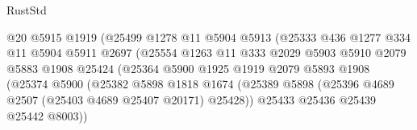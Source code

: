 \begin{lexlean}{RustStd}
\begin{coremodule}
{\begin{coremodule}
{{{{{{{{{{{{{{{{{{{{{{{{{{{{{{{{{{{{{{{{{{{                                    @20
                                    @5915
                                    @1919
                                    (@25499
                                      @1278
                                      @11
                                      @5904
                                      @5913
                                      (@25333
                                        @436
                                        @1277
                                        @334
                                        @11
                                        @5904
                                        @5911
                                        @2697
                                        (@25554
                                          @1263
                                          @11
                                          @333
                                          @2029
                                          @5903
                                          @5910
                                          @2079
                                          @5883
                                          @1908
                                          @25424
                                          (@25364
                                            @5900
                                            @1925
                                            @1919
                                            @2079
                                            @5893
                                            @1908
                                            (@25374
                                              @5900
                                              (@25382
                                                @5898
                                                @1818
                                                @1674
                                                (@25389
                                                  @5898
                                                  (@25396
                                                    @4689
                                                    @2507
                                                    (@25403 @4689 @25407 @20171)
                                                    @25428))
                                                @25433
                                                @25436
                                                @25439
                                                @25442
                                                @8003))
}}}}}}}}}}}}}}}}}}}}}}}}}}}}}}}}}}}}}}}}}}}
\end{coremodule}}
\end{coremodule}
\end{lexlean}
